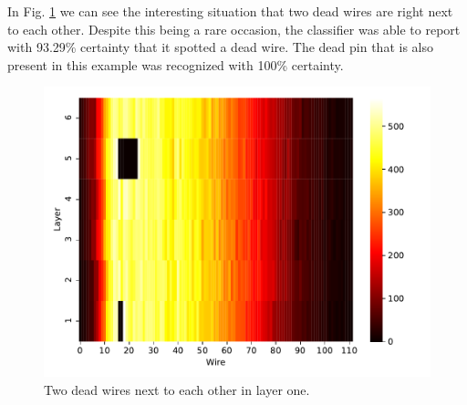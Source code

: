 In Fig. \ref{fig:two-wires} we can see the interesting situation that
two dead wires are right next to each other. Despite this being a rare
occasion, the classifier was able to report with 93.29\% certainty
that it spotted a dead wire. The dead pin that is also present in this
example was recognized with 100\% certainty.

\begin{figure}
  \includegraphics[width=\textwidth]{../figures/two_wires}
  \caption{Two dead wires next to each other in layer one.}
  \label{fig:two-wires}
\end{figure}
